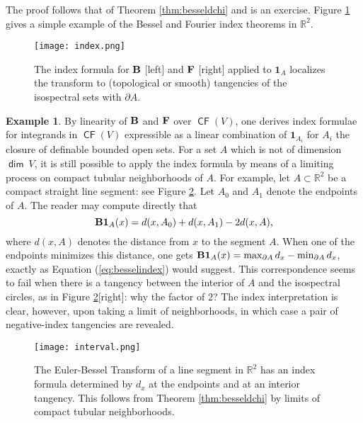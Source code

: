 \documentclass{psapm-l}
\theoremstyle{definition}
\newtheorem{example}[theorem]{Example}
\theoremstyle{remark}
\numberwithin{equation}{section}
\begin{document}
The proof follows that of Theorem \ref{thm:besseldchi} and is an exercise. Figure \ref{fig:index} gives a simple example of the Bessel and Fourier index theorems in ${{\mathbb R}}^2$.

\begin{figure}[htb]
\begin{center}
\texttt{[image: index.png]}
\caption{The index formula for ${{\bf B}}$ [left] and ${{\bf F}}$ [right] applied to ${{\mathbf{1}}}_A$ localizes the transform to (topological or smooth) tangencies of the isospectral sets with ${\partial} A$.}
\label{fig:index}
\end{center}
\end{figure}

\begin{example}
By linearity of ${{\bf B}}$ and ${{\bf F}}$ over ${{{\operatorname{\mathsf{{CF}}}}}}(V)$, one derives index formulae for integrands in ${{{\operatorname{\mathsf{{CF}}}}}}(V)$ expressible as a linear combination of ${{\mathbf{1}}}_{A_i}$ for $A_i$ the closure of definable bounded open sets. For a set $A$ which is not of dimension ${{{\operatorname{\mathsf{{dim}}}}}}\ V$, it is still possible to apply the index formula by means of a limiting process on compact tubular neighborhoods of $A$. For example, let $A\subset{{\mathbb R}}^2$ be a compact straight line segment: see Figure \ref{fig:interval}. Let $A_0$ and $A_1$ denote the endpoints of $A$. The reader may compute directly that
\[
    {{\bf B}}{{\mathbf{1}}}_A(x) =  d(x,A_0) + d(x,A_1) - 2d(x,A),
\]
where $d(x,A)$ denotes the distance from $x$ to the segment $A$. When one of the endpoints minimizes this distance, one gets ${{\bf B}}{{\mathbf{1}}}_A(x)=\max_{{\partial} A}d_x - \min_{{\partial} A}d_x$, exactly as Equation (\ref{eq:besselindex}) would suggest. This correspondence seems to fail when there is a tangency between the interior of $A$ and the isospectral circles, as in Figure \ref{fig:interval}[right]: why the factor of $2$? The index interpretation is clear, however, upon taking a limit of neighborhoods, in which case a pair of negative-index tangencies are revealed.

\begin{figure}[bht]
\begin{center}
\texttt{[image: interval.png]}
\caption{The Euler-Bessel Transform of a line segment in ${{\mathbb R}}^2$ has an index formula determined by $d_x$ at the endpoints and at an interior tangency. This follows from Theorem \ref{thm:besseldchi} by limits of compact tubular neighborhoods.}
\label{fig:interval}
\end{center}
\end{figure}
\end{example}
\end{document}
